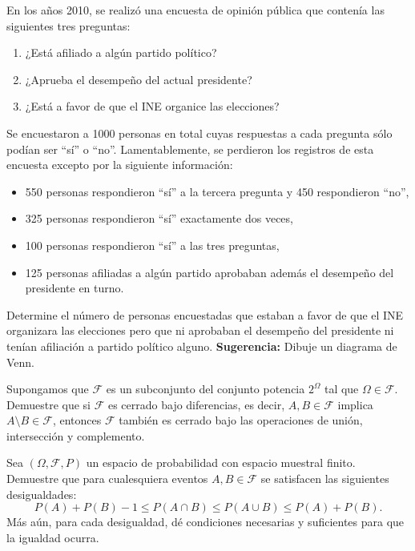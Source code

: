 \documentclass[12pt,a4paper]{article}
\begin{document}
    \begin{mdframed}[style=mdbluebox,frametitle={Ejercicio 6}]
        En los años 2010, se realizó una encuesta de opinión pública que contenía las siguientes tres preguntas:
        \begin{enumerate}
            \item ¿Está afiliado a algún partido político?
            \item ¿Aprueba el desempeño del actual presidente?
            \item ¿Está a favor de que el INE organice las elecciones?
        \end{enumerate}
        Se encuestaron a 1000 personas en total cuyas respuestas a cada pregunta sólo podían ser ``sí'' o ``no''. Lamentablemente, se perdieron los registros de esta encuesta excepto por la siguiente información:
        \begin{itemize}
            \item 550 personas respondieron ``sí'' a la tercera pregunta y 450 respondieron ``no'',
            \item 325 personas respondieron ``sí'' exactamente dos veces,
            \item 100 personas respondieron ``sí'' a las tres preguntas,
            \item 125 personas afiliadas a algún partido aprobaban además el desempeño del presidente en turno.
        \end{itemize}
        Determine el número de personas encuestadas que estaban a favor de que el INE organizara las elecciones pero que ni aprobaban el desempeño del presidente ni tenían afiliación a partido político alguno.
        \textbf{Sugerencia:} Dibuje un diagrama de Venn.
    \end{mdframed}

    \begin{mdframed}[style=mdbluebox,frametitle={Ejercicio 7}]
        Supongamos que $\mathcal{F}$ es un subconjunto del conjunto potencia $2^\Omega$ tal que $\Omega \in \mathcal{F}$. Demuestre que si $\mathcal{F}$ es cerrado bajo diferencias, es decir, $A, B \in \mathcal{F}$ implica $A \setminus B \in \mathcal{F}$, entonces $\mathcal{F}$ también es cerrado bajo las operaciones de unión, intersección y complemento.
    \end{mdframed}

    \begin{mdframed}[style=mdbluebox,frametitle={Ejercicio 8}]
        Sea $(\Omega, \mathcal{F}, P)$ un espacio de probabilidad con espacio muestral finito. Demuestre que para cualesquiera eventos $A, B \in \mathcal{F}$ se satisfacen las siguientes desigualdades:
        \begin{equation*}
            P(A) + P(B) - 1 \le P(A \cap B) \le P(A \cup B) \le P(A) + P(B).
        \end{equation*}
        Más aún, para cada desigualdad, dé condiciones necesarias y suficientes para que la igualdad ocurra.
    \end{mdframed}
\end{document}
